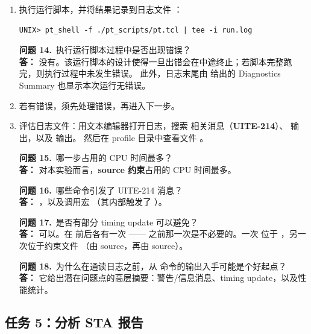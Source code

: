 \begin{enumerate}
  \item 执行运行脚本，并将结果记录到日志文件 ：
\begin{lstlisting}
UNIX> pt_shell -f ./pt_scripts/pt.tcl | tee -i run.log
\end{lstlisting}

\begin{questionBox}
\textbf{问题 14.}\ 执行运行脚本过程中是否出现错误？\\[0.35em]
\textbf{答：} 没有。该运行脚本的设计使得一旦出错会在中途终止；若脚本完整跑完，则执行过程中未发生错误。
此外，日志末尾由  给出的 Diagnostics Summary 也显示本次运行无错误。
\end{questionBox}

  \item 若有错误，须先处理错误，再进入下一步。

  \item 评估日志文件：用文本编辑器打开日志，搜索  相关消息（\textbf{UITE-214}）、
         输出，以及  输出。
        然后在 profile 目录中查看文件 。

\begin{questionBox}
\textbf{问题 15.}\ 哪一步占用的 CPU 时间最多？\\[0.35em]
\textbf{答：} 对本实验而言，\textbf{source 约束}占用的 CPU 时间最多。

\textbf{问题 16.}\ 哪些命令引发了 UITE-214 消息？\\[0.35em]
\textbf{答：} ，以及调用宏 （其内部触发了 ）。

\textbf{问题 17.}\ 是否有部分 timing update 可以避免？\\[0.35em]
\textbf{答：} 可以。在  前后各有一次 ——
之前那一次是不必要的。一次  位于 ，另一次位于约束文件
（由  source，再由  source）。

\textbf{问题 18.}\ 为什么在通读日志之前，从  命令的输出入手可能是个好起点？\\[0.35em]
\textbf{答：} 它给出潜在问题点的高层摘要：警告/信息消息、timing update，以及性能统计。
\end{questionBox}
\end{enumerate}

\subsection{任务 5：分析 STA 报告}
\label{lab1:task5}

